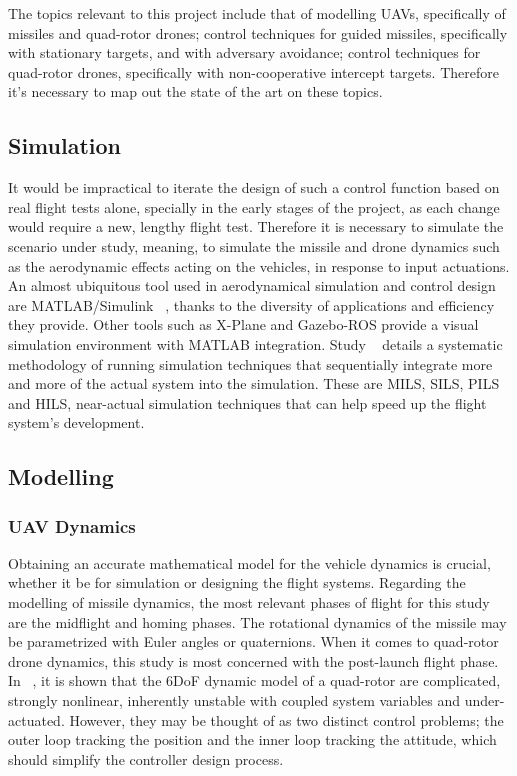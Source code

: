 The topics relevant to this project include that of modelling \gls{UAVs}, specifically of missiles and quad-rotor drones; control techniques for guided missiles, specifically with stationary targets, and with adversary avoidance; control techniques for quad-rotor drones, specifically with non-cooperative intercept targets. Therefore it's necessary to map out the state of the art on these topics. \\

\subsection{Simulation}
\label{sec:simulation}

It would be impractical to iterate the design of such a control function based on real flight tests alone, specially in the early stages of the project, as each change would require a new, lengthy flight test. Therefore it is necessary to simulate the scenario under study, meaning, to simulate the missile and drone dynamics such as the aerodynamic effects acting on the vehicles, in response to input actuations. An almost ubiquitous tool used in aerodynamical simulation and control design are MATLAB/Simulink ~\cite{MATLAB}, thanks to the diversity of applications and efficiency they provide. Other tools such as X-Plane and Gazebo-ROS provide a visual simulation environment with MATLAB integration. Study ~\cite{MuhammadT} details a systematic methodology of running simulation techniques that sequentially integrate more and more of the actual system into the simulation. These are \gls{MILS}, \gls{SILS}, \gls{PILS} and \gls{HILS}, near-actual simulation techniques that can help speed up the flight system's development. 

\subsection{Modelling}
\label{sec:modelling}

\subsubsection{UAV Dynamics}

Obtaining an accurate mathematical model for the vehicle dynamics is crucial, whether it be for simulation or designing the flight systems. Regarding the modelling of missile dynamics, the most relevant phases of flight for this study are the midflight and homing phases. The rotational dynamics of the missile may be parametrized with Euler angles or quaternions.
When it comes to quad-rotor drone dynamics, this study is most concerned with the post-launch flight phase. In ~\cite{XiadongZ}, it is shown that the 6DoF dynamic model of a quad-rotor are complicated, strongly nonlinear, inherently unstable with coupled system variables and under-actuated. However, they may be thought of as two distinct control problems; the outer loop tracking the position and the inner loop tracking the attitude, which should simplify the controller design process. \\

